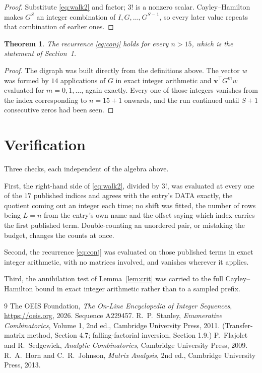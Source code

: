 \documentclass[11pt,a4paper]{article}
\theoremstyle{plain}
\newtheorem{theorem}{Theorem}
\theoremstyle{definition}
\begin{document}
\begin{proof}
Substitute \eqref{eq:walk2} and factor; $3!$ is a nonzero scalar. Cayley--Hamilton
makes $G^{S}$ an integer combination of $I,G,\dots,G^{S-1}$, so every later value repeats
that combination of earlier ones.
\end{proof}

\begin{theorem}
The recurrence \eqref{eq:conj} holds for every $n>15$, which is the statement of
Section~1.
\end{theorem}

\begin{proof}
The digraph was built directly from the definitions above. The vector $w$ was formed by
$14$ applications of $G$ in exact integer arithmetic and $\mathbf{v}^{\!\top}G^{m}w$
evaluated for $m=0,1,\dots$, again exactly. Every one of those integers vanishes from the
index corresponding to $n=15+1$ onwards, and the run continued until $S+1$ consecutive
zeros had been seen.
\end{proof}

\section{Verification}

Three checks, each independent of the algebra above.

First, the right-hand side of \eqref{eq:walk2}, divided by $3!$, was evaluated at every
one of the $17$ published indices and agrees with the entry's DATA exactly, the quotient
coming out an integer each time; no shift was fitted, the number of rows being $L=n$
from the entry's own name and the offset saying which index carries the first published term.
Double-counting an unordered pair, or mistaking the budget, changes the counts at once.

Second, the recurrence \eqref{eq:conj} was evaluated on those published terms in exact
integer arithmetic, with no matrices involved, and vanishes wherever it applies.

Third, the annihilation test of Lemma~\ref{lem:crit} was carried to the full
Cayley--Hamilton bound in exact integer arithmetic rather than to a sampled prefix.

\begin{thebibliography}{9}
 The OEIS Foundation, \emph{The On-Line Encyclopedia of Integer
Sequences}, \url{https://oeis.org}, 2026. Sequence A229457.
 R.~P.~Stanley, \emph{Enumerative Combinatorics}, Volume 1, 2nd ed.,
Cambridge University Press, 2011. (Transfer-matrix method, Section 4.7; falling-factorial
inversion, Section 1.9.)
 P.~Flajolet and R.~Sedgewick, \emph{Analytic Combinatorics}, Cambridge
University Press, 2009.
 R.~A.~Horn and C.~R.~Johnson, \emph{Matrix Analysis}, 2nd ed., Cambridge
University Press, 2013.
\end{thebibliography}
\end{document}
